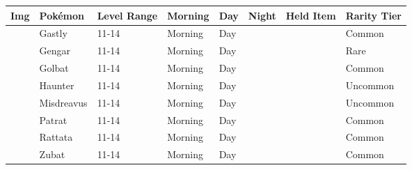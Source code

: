 \begin{longtable}{||l l l l l l l l||}%
\hline%
Img&Pokémon&Level Range&Morning&Day&Night&Held Item&Rarity Tier\\%
\hline%
\endhead%
\hline%
&Gastly&11{-}14&Morning&Day&&&Common\\%
\hline%
&Gengar&11{-}14&Morning&Day&&&Rare\\%
\hline%
&Golbat&11{-}14&Morning&Day&&&Common\\%
\hline%
&Haunter&11{-}14&Morning&Day&&&Uncommon\\%
\hline%
&Misdreavus&11{-}14&Morning&Day&&&Uncommon\\%
\hline%
&Patrat&11{-}14&Morning&Day&&&Common\\%
\hline%
&Rattata&11{-}14&Morning&Day&&&Common\\%
\hline%
&Zubat&11{-}14&Morning&Day&&&Common\\%
\hline%
\end{longtable}